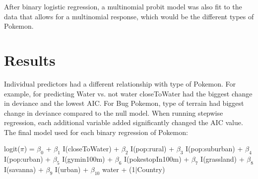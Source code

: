 \documentclass{article}
\begin{document}
After binary logistic regression, a multinomial probit model was also fit to the data that allows for a multinomial response, which would be the different types of Pokemon.

\section{Results}
Individual predictors had a different relationship with type of Pokemon. For example, for predicting Water vs. not water closeToWater had the biggest change in deviance and the lowest AIC. For Bug Pokemon, type of terrain had biggest change in deviance compared to the null model. When running stepwise regression, each additional variable added significantly changed the AIC value. The final model used for each binary regression of Pokemon:

\begin{center}
logit($\pi$) = $\beta_0$ + $\beta_1$ I(closeToWater) + $\beta_2$ I(pop:rural) + $\beta_3$ I(pop:suburban) + $\beta_4$ I(pop:urban) + $\beta_5$ I(gymin100m) + $\beta_6$ I(pokestopIn100m) + $\beta_7$ I(grassland) + $\beta_8$ I(savanna) + $\beta_9$ I(urban) + $\beta_{10}$ water + (1$|$Country)
\end{center}
\end{document}

